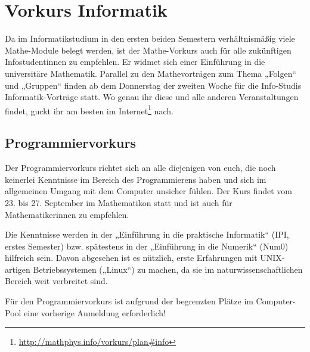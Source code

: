 \section{Vorkurs Informatik}
Da im Informatikstudium in den ersten beiden Semestern verhältnismäßig viele Mathe-Module belegt werden, ist der Mathe-Vorkurs auch für alle zukünftigen Infostudentinnen zu empfehlen. Er widmet sich einer Einführung in die universitäre Mathematik.
Parallel zu den Mathevorträgen zum Thema „Folgen“ und „Gruppen“ finden ab dem Donnerstag der zweiten Woche für die Info-Studis Informatik-Vorträge statt. Wo genau ihr diese und alle anderen Veranstaltungen findet, guckt ihr am besten im Internet\footnote{\url{http://mathphys.info/vorkurs/plan\#info}} nach.%


\subsection{Programmiervorkurs}
Der Programmiervorkurs richtet sich an alle diejenigen von euch, die noch keinerlei Kenntnisse im Bereich des Programmierens haben und sich im allgemeinen Umgang mit dem Computer unsicher fühlen. Der Kurs findet vom 23. bis 27. September im Mathematikon statt und ist auch für Mathematikerinnen zu empfehlen.

Die Kenntnisse werden in der „Einführung in die praktische Informatik“ (\gls{IPI}, erstes Semester) bzw. spätestens in der „Einführung in die Numerik“ (\gls{Num0}) hilfreich sein. Davon abgesehen ist es nützlich, erste Erfahrungen mit UNIX-artigen Betriebssystemen („Linux“) zu machen, da sie im naturwissenschaftlichen Bereich weit verbreitet sind.

Für den Programmiervorkurs ist aufgrund der begrenzten Plätze im Computer-Pool eine vorherige Anmeldung erforderlich!
